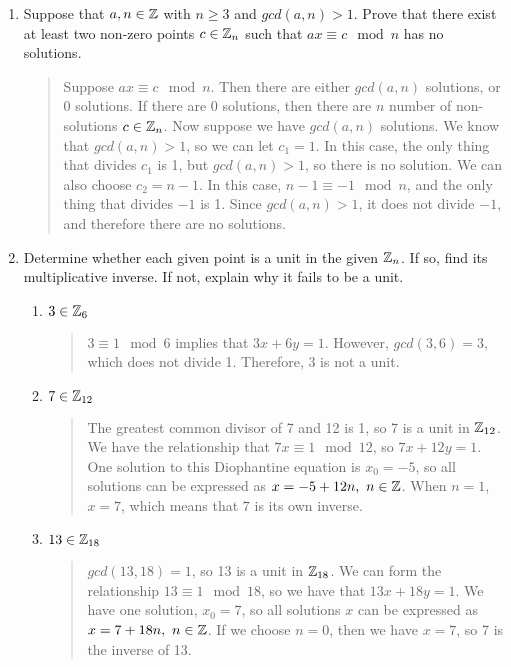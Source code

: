 \documentclass{hw}
\begin{document}
\begin{enumerate}
\item Suppose that $a,n\in\mathbb{Z}$ with $n\geq3$ and $gcd(a,n)>1$. Prove that there exist at least two
non-zero points $c\in\mathbb{Z}_{n}$ such that $ax\equiv c\mod n$ has no solutions.
\begin{quote}
Suppose $ax\equiv c\mod n$. Then there are either $gcd(a,n)$ solutions, or 0 solutions. If there are
0 solutions, then there are $n$ number of non-solutions $c\in\mathbb{Z}_{n}$. Now suppose we have $gcd(a,n)$
solutions. We know that $gcd(a,n)>1$, so we can let $c_{1}=1$. In this case, the only thing that
divides $c_{1}$ is 1, but $gcd(a,n)>1$, so there is no solution. We can also choose $c_{2}=n-1$. In
this case, $n-1\equiv-1\mod n$, and the only thing that divides $-1$ is 1. Since $gcd(a,n)>1$, it does
not divide $-1$, and therefore there are no solutions.
\end{quote}

\item Determine whether each given point is a unit in the given $\mathbb{Z}_{n}$. If so, find its
multiplicative inverse. If not, explain why it fails to be a unit.
\begin{enumerate}
\item $3\in\mathbb{Z}_{6}$
\begin{quote}
$3\equiv1\mod6$ implies that $3x+6y=1$. However, $gcd(3,6)=3$, which does not divide 1. Therefore, 3
is not a unit.
\end{quote}
\item $7\in\mathbb{Z}_{12}$
\begin{quote}
The greatest common divisor of 7 and 12 is 1, so 7 is a unit in $\mathbb{Z}_{12}$. We have the relationship
that $7x\equiv1\mod12$, so $7x+12y=1$. One solution to this Diophantine equation is $x_{0}=-5$, so all
solutions can be expressed as $x=-5+12n,\ n\in\mathbb{Z}$. When $n=1$, $x=7$, which means that $7$ is its own
inverse.
\end{quote}
\item $13\in\mathbb{Z}_{18}$
\begin{quote}
$gcd(13,18)=1$, so 13 is a unit in $\mathbb{Z}_{18}$. We can form the relationship $13\equiv1\mod18$, so we
have that $13x+18y=1$. We have one solution, $x_{0}=7$, so all solutions $x$ can be expressed as
$x=7+18n,\ n\in\ZZ$. If we choose $n=0$, then we have $x=7$, so 7 is the inverse of 13.
\end{quote}
\end{enumerate}


\end{enumerate}
\end{document}

